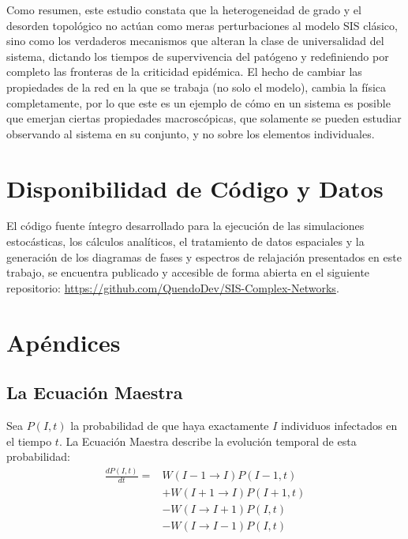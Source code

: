 \documentclass[%
reprint,
amsmath,amssymb,
aps,
]{revtex4-2}
\begin{document}
	Como resumen, este estudio constata que la heterogeneidad de grado y el desorden topológico no actúan como meras perturbaciones al modelo SIS clásico, sino como los verdaderos mecanismos que alteran la clase de universalidad del sistema, dictando los tiempos de supervivencia del patógeno y redefiniendo por completo las fronteras de la criticidad epidémica. El hecho de cambiar las propiedades de la red en la que se trabaja (no solo el modelo), cambia la física completamente, por lo que este es un ejemplo de cómo en un sistema es posible que emerjan ciertas propiedades macroscópicas, que solamente se pueden estudiar observando al sistema en su conjunto, y no sobre los elementos individuales.
	
	\section*{Disponibilidad de Código y Datos}
	El código fuente íntegro desarrollado para la ejecución de las simulaciones estocásticas, los cálculos analíticos, el tratamiento de datos espaciales y la generación de los diagramas de fases y espectros de relajación presentados en este trabajo, se encuentra publicado y accesible de forma abierta en el siguiente repositorio: \url{https://github.com/QuendoDev/SIS-Complex-Networks}.
	
	
	
	
	\section{Apéndices}
	\subsection{La Ecuación Maestra}\label{apendice:mean_field}
	
	Sea $P(I, t)$ la probabilidad de que haya exactamente $I$ individuos infectados en el tiempo $t$. La Ecuación Maestra describe la evolución temporal de esta probabilidad:
	\begin{equation}
		\begin{split}
			\frac{dP(I,t)}{dt} ={} & W(I-1 \to I)P(I-1,t) \\
			& + W(I+1 \to I)P(I+1,t) \\
			& - W(I \to I+1)P(I,t) \\
			& - W(I \to I-1)P(I,t)
		\end{split}
	\end{equation}
	
\end{document}
